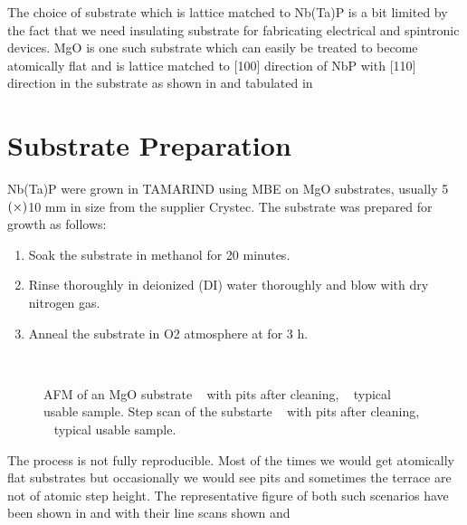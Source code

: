 The choice of substrate which is lattice matched to Nb(Ta)P is a bit limited by the 
fact that we need insulating substrate for fabricating electrical and spintronic 
devices. MgO is one such substrate which can easily be treated to become atomically
flat and is lattice matched to [100] direction of NbP with [110] direction in the
substrate as shown in  and tabulated in 

\section{Substrate Preparation}

Nb(Ta)P were grown in TAMARIND using MBE on MgO substrates, usually 5$\text(\times)$10 mm in 
size from the supplier Crystec. The substrate was prepared for growth as follows:

\begin{enumerate}
    \item Soak the substrate in methanol for 20 minutes.
    \item Rinse thoroughly in deionized (DI) water thoroughly and blow with dry nitrogen gas.
    \item Anneal the substrate in O2 atmosphere at  for 3 h.
\end{enumerate}

\begin{figure}
    \centering
    \\
    \caption{
        AFM of  an MgO substrate 
        \sfA~ with pits after cleaning, 
        \sfB~ typical usable sample.
        Step scan of the substarte  
        \sfC~ with pits after cleaning,
        \sfD~ typical usable sample.
    }
\end{figure}

The process is not fully reproducible. Most of the times we would get atomically flat substrates 
but occasionally we would see pits and sometimes the terrace are not of atomic step height. 
The representative figure of both such scenarios have been shown in  and
  with their line scans shown  and 

